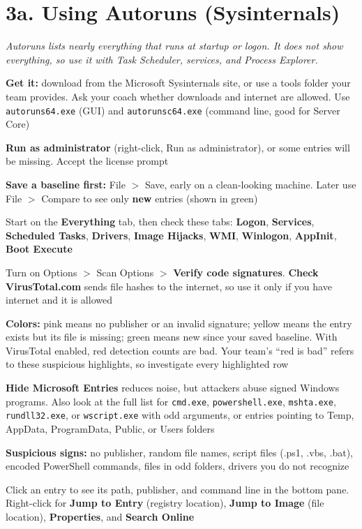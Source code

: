 \documentclass[11pt]{article}
\newcommand{\cmd}[1]{\texttt{\small #1}}
\begin{document}
\section*{3a. Using Autoruns (Sysinternals)}
\textit{Autoruns lists nearly everything that runs at startup or logon. It does not show everything, so use it with Task Scheduler, services, and Process Explorer.}
\begin{mycheck}
  \item \textbf{Get it:} download from the Microsoft Sysinternals site, or use a tools folder your team provides. Ask your coach whether downloads and internet are allowed. Use \cmd{autoruns64.exe} (GUI) and \cmd{autorunsc64.exe} (command line, good for Server Core)
  \item \textbf{Run as administrator} (right-click, Run as administrator), or some entries will be missing. Accept the license prompt
  \item \textbf{Save a baseline first:} File $>$ Save, early on a clean-looking machine. Later use File $>$ Compare to see only \textbf{new} entries (shown in green)
  \item Start on the \textbf{Everything} tab, then check these tabs: \textbf{Logon}, \textbf{Services}, \textbf{Scheduled Tasks}, \textbf{Drivers}, \textbf{Image Hijacks}, \textbf{WMI}, \textbf{Winlogon}, \textbf{AppInit}, \textbf{Boot Execute}
  \item Turn on Options $>$ Scan Options $>$ \textbf{Verify code signatures}. \textbf{Check VirusTotal.com} sends file hashes to the internet, so use it only if you have internet and it is allowed
  \item \textbf{Colors:} pink means no publisher or an invalid signature; yellow means the entry exists but its file is missing; green means new since your saved baseline. With VirusTotal enabled, red detection counts are bad. Your team's ``red is bad'' refers to these suspicious highlights, so investigate every highlighted row
  \item \textbf{Hide Microsoft Entries} reduces noise, but attackers abuse signed Windows programs. Also look at the full list for \cmd{cmd.exe}, \cmd{powershell.exe}, \cmd{mshta.exe}, \cmd{rundll32.exe}, or \cmd{wscript.exe} with odd arguments, or entries pointing to Temp, AppData, ProgramData, Public, or Users folders
  \item \textbf{Suspicious signs:} no publisher, random file names, script files (.ps1, .vbs, .bat), encoded PowerShell commands, files in odd folders, drivers you do not recognize
  \item Click an entry to see its path, publisher, and command line in the bottom pane. Right-click for \textbf{Jump to Entry} (registry location), \textbf{Jump to Image} (file location), \textbf{Properties}, and \textbf{Search Online}

\end{mycheck}
\end{document}
